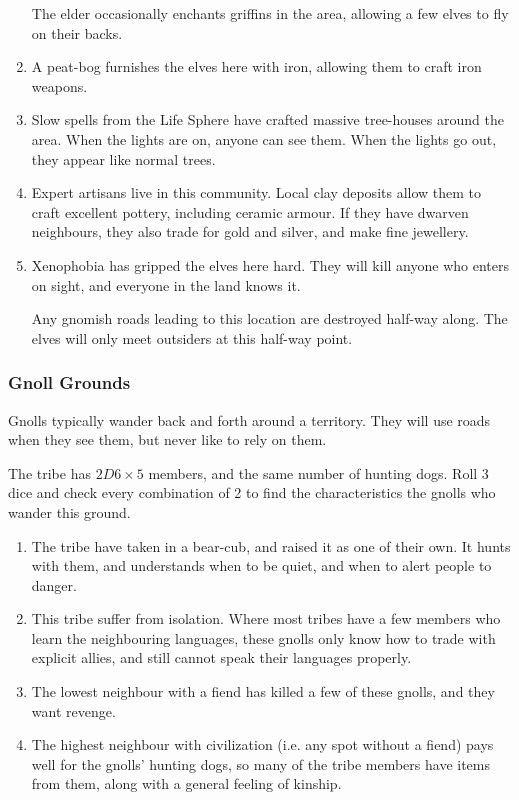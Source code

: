 \begin{multicols}{2}
\begin{enumerate}
  The elder occasionally enchants griffins in the area, allowing a few elves to fly on their backs.
  \item
  A peat-bog furnishes the elves here with iron, allowing them to craft iron weapons.
  \item
  Slow spells from the Life Sphere have crafted massive tree-houses around the area.
  When the lights are on, anyone can see them.
  When the lights go out, they appear like normal trees.
  \item
  Expert artisans live in this community.
  Local clay deposits allow them to craft excellent pottery, including ceramic armour.
  If they have dwarven neighbours, they also trade for gold and silver, and make fine jewellery.
  \item
  Xenophobia has gripped the elves here hard.
  They will kill anyone who enters on sight, and everyone in the land knows it.

  Any gnomish roads leading to this location are destroyed half-way along.
  The elves will only meet outsiders at this half-way point.
\end{enumerate}

\subsubsection{Gnoll Grounds}
\label{gnollPoint}

Gnolls typically wander back and forth around a territory.
They will use roads when they see them, but never like to rely on them.

The tribe has $2D6 \times 5$ members, and the same number of hunting dogs.
Roll 3 dice and check every combination of 2 to find the characteristics the gnolls who wander this ground.

\begin{enumerate}
  \item
  The tribe have taken in a bear-cub, and raised it as one of their own.
  It hunts with them, and understands when to be quiet, and when to alert people to danger.
  \item
  This tribe suffer from isolation.
  Where most tribes have a few members who learn the neighbouring languages, these gnolls only know how to trade with explicit allies, and still cannot speak their languages properly.
  \item
  The lowest neighbour with a fiend has killed a few of these gnolls, and they want revenge.
  \item
  The highest neighbour with civilization (i.e. any spot without a fiend) pays well for the gnolls' hunting dogs, so many of the tribe members have items from them, along with a general feeling of kinship.


\end{enumerate}
\end{multicols}
